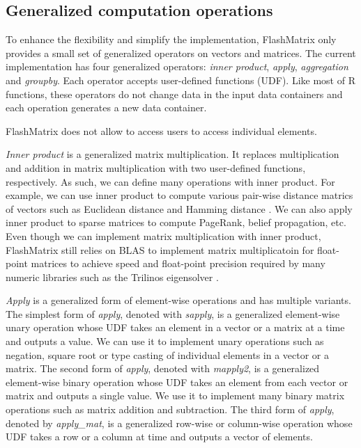 


\subsection{Generalized computation operations} \label{sec:generalized}
To enhance the flexibility and simplify the implementation, FlashMatrix only
provides a small set of generalized operators on vectors and matrices.
The current implementation has four generalized operators: \textit{inner product},
\textit{apply}, \textit{aggregation} and \textit{groupby}. Each operator
accepts user-defined functions (UDF). Like most of R functions, these operators
do not change data in the input data containers and each operation generates
a new data container.

FlashMatrix does not allow to access users to access individual elements.

\textit{Inner product} is a generalized matrix multiplication. It replaces
multiplication and addition in matrix multiplication with two user-defined
functions, respectively. As such, we can define many operations with inner
product. For example, we can use inner product to compute various pair-wise
distance matrics of vectors such as Euclidean distance \cite{euclidean} and
Hamming distance \cite{hamming}. We can also apply inner product to sparse
matrices to compute PageRank, belief propagation, etc.
Even though we can implement matrix multiplication with inner product,
FlashMatrix still relies on BLAS to implement matrix multiplicatoin for
float-point matrices to achieve speed and float-point precision required by
many numeric libraries such as the Trilinos eigensolver \cite{anasazi}.

\textit{Apply} is a generalized form of element-wise operations and has
multiple variants. The simplest form of \textit{apply}, denoted with
\textit{sapply}, is a generalized element-wise unary operation whose
UDF takes an element in a vector or a matrix at a time and outputs a value.
We can use it to implement unary operations such as negation, square root
or type casting of individual elements in a vector or a matrix. The second
form of \textit{apply}, denoted with \textit{mapply2}, is a generalized
element-wise binary operation whose UDF takes an element from each vector
or matrix and outputs a single value. We use it to implement many binary
matrix operations such as matrix addition and subtraction. The third form of
\textit{apply}, denoted by \textit{apply\_mat}, is a generalized row-wise or
column-wise operation whose UDF takes a row or a column at time and outputs
a vector of elements.

